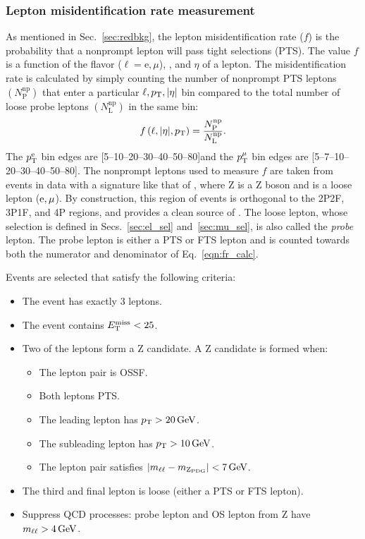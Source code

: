 \subsubsection{Lepton misidentification rate measurement}
\label{sec:fr_evtsel}
As mentioned in Sec.~\ref{sec:redbkg}, the lepton misidentification rate ($f$) is the probability that a nonprompt lepton will pass tight selections (PTS).
The value $f$ is a function of the flavor ($\ell = \text{e}, \mu$), \pt, and $\eta$ of a lepton.
The misidentification rate is calculated by simply counting the number of nonprompt PTS leptons $\left( N^{\mathrm{np}}_{\mathrm{P}} \right)$ that enter a particular $\ell, p_{\mathrm{T}}, \lvert \eta \rvert$ bin compared to the total number of loose probe leptons $\left( N^{\mathrm{np}}_{\mathrm{L}} \right)$ in the same bin:
\begin{equation}
	\label{eqn:fr_calc}
	f\left( \ell, \lvert \eta \rvert, p_{\mathrm{T}} \right) = 
	\frac{
		N^{\mathrm{np}}_{\mathrm{P}}
		}{
		N^{\mathrm{np}}_{\mathrm{L}}
		}.
\end{equation}
The $p_{\mathrm{T}}^\mathrm{e}$ bin edges are [5--10--20--30--40--50--80]\GeV and the $p_{\mathrm{T}}^{\mu}$ bin edges are [5--7--10--20--30--40--50--80]\GeV.
The nonprompt leptons used to measure $f$ are taken from events in data with a signature like that of \ZplusL, where Z is a Z boson and \looselep is a loose lepton ($\mathrm{e}, \mu$).
By construction, this region of events is orthogonal to the 2P2F, 3P1F, and 4P regions, and provides a clean source of \looselep.
The loose lepton, whose selection is defined in Secs.~\ref{sec:el_sel} and~\ref{sec:mu_sel}, is also called the \emph{probe} lepton.
The probe lepton is either a PTS or FTS lepton and is counted towards both the numerator and denominator of Eq.~\ref{eqn:fr_calc}. 

Events are selected that satisfy the following criteria:
\begin{itemize}
	\item The event has exactly 3 leptons.
	\item The event contains $E_{\mathrm{T}}^{\text{miss}} < 25$\GeV.
	\item Two of the leptons form a Z candidate. A Z candidate is formed when:
	\begin{itemize}
		\item The lepton pair is OSSF.
		\item Both leptons PTS.
		\item The leading lepton has $p_{\mathrm{T}} > 20\,\text{Ge\hspace{-.08em}V}$.
		\item The subleading lepton has $p_{\mathrm{T}} > 10\,\text{Ge\hspace{-.08em}V}$.
		\item The lepton pair satisfies $\left| m_{\ell\ell} - m_{\mathrm{Z}_{\text{PDG}}} \right| < 7\,\text{Ge\hspace{-.08em}V}$.
	\end{itemize}
	\item The third and final lepton is loose (\ie either a PTS or FTS lepton).
	\item Suppress QCD processes: probe lepton and OS lepton from Z have $m_{\ell\ell} > 4\,\text{Ge\hspace{-.08em}V}$.
\end{itemize}

